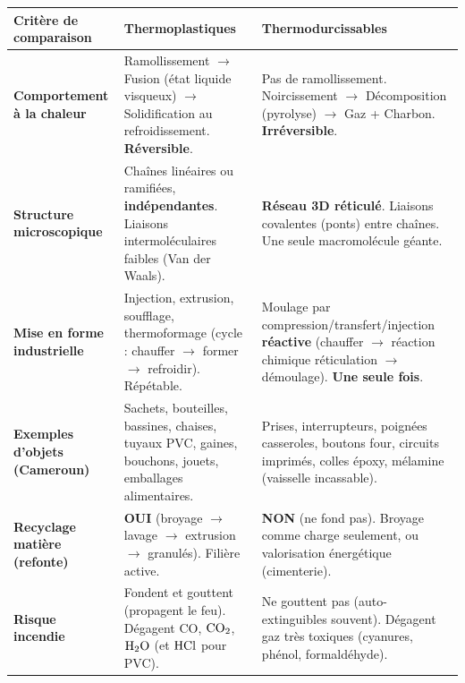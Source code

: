 \documentclass[11pt]{article}
\begin{document}
\begin{center}
\begin{tabularx}{\linewidth}{|>{\bfseries}l|X|X|}\hline
\rowcolor{popblueL}
\textbf{Critère de comparaison} & \textbf{Thermoplastiques} & \textbf{Thermodurcissables} \\ \hline
\textbf{Comportement à la chaleur} & Ramollissement $\rightarrow$ Fusion (état liquide visqueux) $\rightarrow$ Solidification au refroidissement. \textbf{Réversible}. & Pas de ramollissement. Noircissement $\rightarrow$ Décomposition (pyrolyse) $\rightarrow$ Gaz + Charbon. \textbf{Irréversible}. \\ \hline
\textbf{Structure microscopique} & Chaînes linéaires ou ramifiées, \textbf{indépendantes}. Liaisons intermoléculaires faibles (Van der Waals). & \textbf{Réseau 3D réticulé}. Liaisons covalentes (ponts) entre chaînes. Une seule macromolécule géante. \\ \hline
\textbf{Mise en forme industrielle} & Injection, extrusion, soufflage, thermoformage (cycle : chauffer $\rightarrow$ former $\rightarrow$ refroidir). Répétable. & Moulage par compression/transfert/injection \textbf{réactive} (chauffer $\rightarrow$ réaction chimique réticulation $\rightarrow$ démoulage). \textbf{Une seule fois}. \\ \hline
\textbf{Exemples d'objets (Cameroun)} & Sachets, bouteilles, bassines, chaises, tuyaux PVC, gaines, bouchons, jouets, emballages alimentaires. & Prises, interrupteurs, poignées casseroles, boutons four, circuits imprimés, colles époxy, mélamine (vaisselle incassable). \\ \hline
\textbf{Recyclage matière (refonte)} & \textbf{OUI} (broyage $\rightarrow$ lavage $\rightarrow$ extrusion $\rightarrow$ granulés). Filière active. & \textbf{NON} (ne fond pas). Broyage comme charge seulement, ou valorisation énergétique (cimenterie). \\ \hline
\textbf{Risque incendie} & Fondent et gouttent (propagent le feu). Dégagent CO, $\ce{CO2}$, $\ce{H2O}$ (et $\ce{HCl}$ pour PVC). & Ne gouttent pas (auto-extinguibles souvent). Dégagent gaz très toxiques (cyanures, phénol, formaldéhyde). \\ \hline
\end{tabularx}
\end{center}
\end{document}
